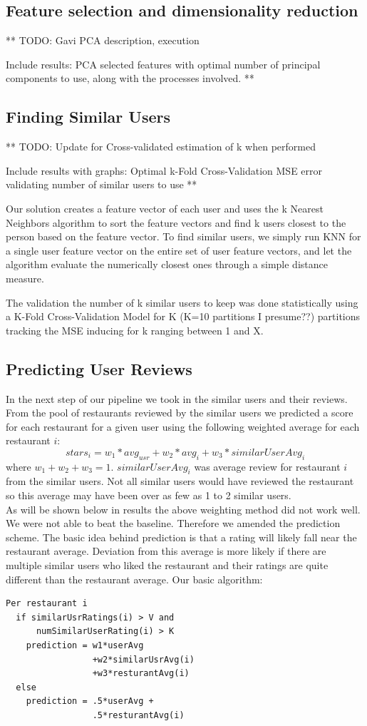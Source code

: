 \documentclass[10pt,twocolumn,letterpaper]{article}
\begin{document}
\subsection{Feature selection and dimensionality reduction}
** 
TODO: Gavi PCA description, execution 

Include results: PCA selected features with optimal number of principal components to use, along with the processes involved.
**

\subsection{Finding Similar Users}
** 
TODO: Update for Cross-validated estimation of k when performed

Include results with graphs: Optimal k-Fold Cross-Validation MSE error validating number of similar users to use
**

Our solution creates a feature vector of each user and uses the k Nearest Neighbors algorithm to sort the feature vectors and find k users closest to the person based on the feature vector. To find similar users, we simply run KNN for a single user feature vector on the entire set of user feature vectors, and let the algorithm evaluate the numerically closest ones through a simple distance measure. 

The validation the number of k similar users to keep was done statistically using a K-Fold Cross-Validation Model for K (K=10 partitions I presume??) partitions tracking the MSE inducing for k ranging between 1 and X. 

\subsection{Predicting User Reviews}
In the next step of our pipeline we took in the similar users and their reviews. From the pool of restaurants reviewed by the similar users we predicted a score for each restaurant for a given user using the following weighted average for each restaurant $i$:
\[stars_{i} = w_1 * avg_{usr} + w_2 * avg_{i} + w_3 * similarUserAvg_{i}\]
 where $w_1 + w_2 + w_3 = 1$. $similarUserAvg_i$ was average review for restaurant $i$ from the similar users. Not all similar users would have reviewed the restaurant so this average may have been over as few as 1 to 2 similar users. 
\\[0.5em]
\indent As will be shown below in results the above weighting method did not work well. We were not able to beat the baseline. Therefore we amended the prediction scheme. The basic idea behind prediction is that a rating will likely fall near the restaurant average. Deviation from this average is more likely if there are multiple similar users who liked the restaurant and their ratings are quite different than the restaurant average. Our basic algorithm:
\begin{verbatim}
Per restaurant i
  if similarUsrRatings(i) > V and
      numSimilarUserRating(i) > K
    prediction = w1*userAvg
                 +w2*similarUsrAvg(i)
                 +w3*resturantAvg(i)
  else
    prediction = .5*userAvg +
                 .5*resturantAvg(i)
\end{verbatim}
\end{document}
